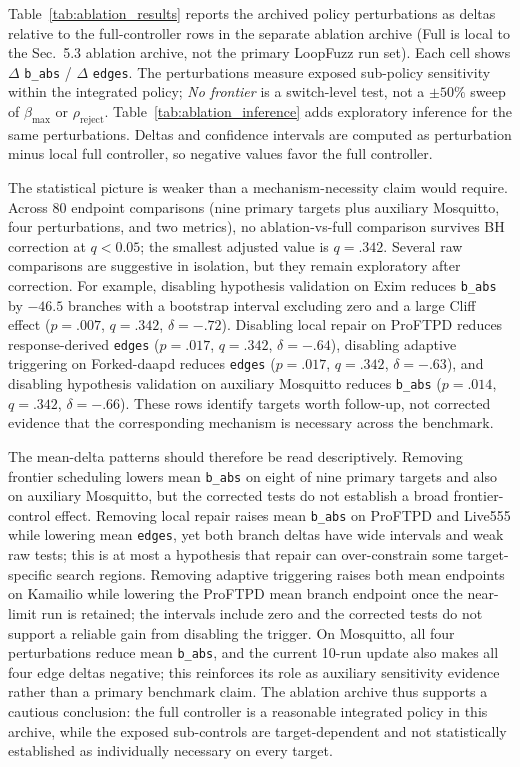\documentclass[final,5p,times,number]{elsarticle}
\begin{document}
Table~\ref{tab:ablation_results} reports the archived policy perturbations as deltas relative to the full-controller rows in the separate ablation archive (Full is local to the Sec.~5.3 ablation archive, not the primary LoopFuzz run set). Each cell shows $\Delta$ \texttt{b\_abs} / $\Delta$ \texttt{edges}. The perturbations measure exposed sub-policy sensitivity within the integrated policy; \emph{No frontier} is a switch-level test, not a $\pm50\%$ sweep of $\beta_{\max}$ or $\rho_{\mathrm{reject}}$. Table~\ref{tab:ablation_inference} adds exploratory inference for the same perturbations. Deltas and confidence intervals are computed as perturbation minus local full controller, so negative values favor the full controller.

The statistical picture is weaker than a mechanism-necessity claim would require. Across 80 endpoint comparisons (nine primary targets plus auxiliary Mosquitto, four perturbations, and two metrics), no ablation-vs-full comparison survives BH correction at $q<0.05$; the smallest adjusted value is $q=.342$. Several raw comparisons are suggestive in isolation, but they remain exploratory after correction. For example, disabling hypothesis validation on Exim reduces \texttt{b\_abs} by $-46.5$ branches with a bootstrap interval excluding zero and a large Cliff effect ($p=.007$, $q=.342$, $\delta=-.72$). Disabling local repair on ProFTPD reduces response-derived \texttt{edges} ($p=.017$, $q=.342$, $\delta=-.64$), disabling adaptive triggering on Forked-daapd reduces \texttt{edges} ($p=.017$, $q=.342$, $\delta=-.63$), and disabling hypothesis validation on auxiliary Mosquitto reduces \texttt{b\_abs} ($p=.014$, $q=.342$, $\delta=-.66$). These rows identify targets worth follow-up, not corrected evidence that the corresponding mechanism is necessary across the benchmark.

The mean-delta patterns should therefore be read descriptively. Removing frontier scheduling lowers mean \texttt{b\_abs} on eight of nine primary targets and also on auxiliary Mosquitto, but the corrected tests do not establish a broad frontier-control effect. Removing local repair raises mean \texttt{b\_abs} on ProFTPD and Live555 while lowering mean \texttt{edges}, yet both branch deltas have wide intervals and weak raw tests; this is at most a hypothesis that repair can over-constrain some target-specific search regions. Removing adaptive triggering raises both mean endpoints on Kamailio while lowering the ProFTPD mean branch endpoint once the near-limit run is retained; the intervals include zero and the corrected tests do not support a reliable gain from disabling the trigger. On Mosquitto, all four perturbations reduce mean \texttt{b\_abs}, and the current 10-run update also makes all four edge deltas negative; this reinforces its role as auxiliary sensitivity evidence rather than a primary benchmark claim. The ablation archive thus supports a cautious conclusion: the full controller is a reasonable integrated policy in this archive, while the exposed sub-controls are target-dependent and not statistically established as individually necessary on every target.
\end{document}
